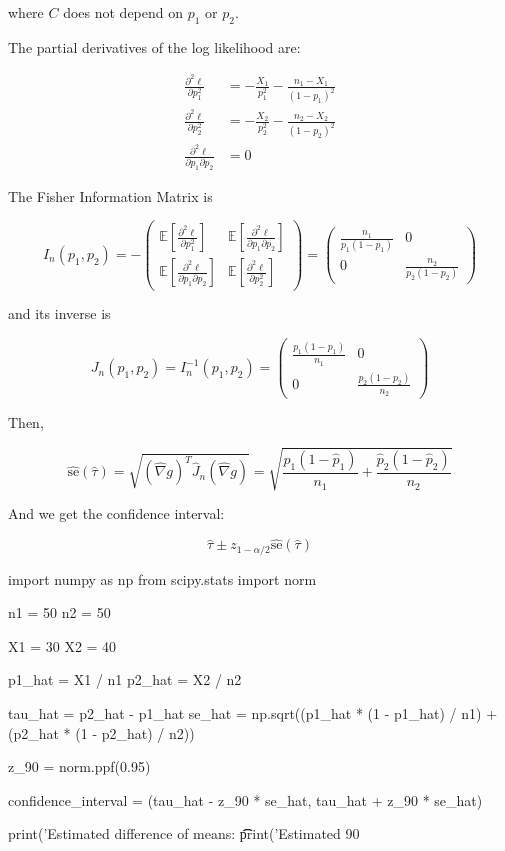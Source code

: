where \(C\) does not depend on \(p_1\) or \(p_2\).

The partial derivatives of the log likelihood are:

\begin{align}
\frac{\partial^2 \ell}{\partial p_1^2} & = - \frac{X_1}{p_1^2} - \frac{n_1 - X_1}{(1 - p_1)^2} \\
\frac{\partial^2 \ell}{\partial p_2^2} & = - \frac{X_2}{p_2^2} - \frac{n_2 - X_2}{(1 - p_2)^2} \\
\frac{\partial^2 \ell}{\partial p_1 \partial p_2} & = 0
\end{align}

The Fisher Information Matrix is

\[ I_n(p_1, p_2) = -\begin{pmatrix}
\mathbb{E}\left[ \frac{\partial^2 \ell}{\partial p_1^2} \right]
& \mathbb{E}\left[ \frac{\partial^2 \ell}{\partial p_1 \partial p_2} \right]  \\
\mathbb{E}\left[ \frac{\partial^2 \ell}{\partial p_1 \partial p_2} \right]
& \mathbb{E}\left[ \frac{\partial^2 \ell}{\partial p_2^2} \right]
\end{pmatrix} = \begin{pmatrix}
\frac{n_1}{p_1(1 - p_1)} & 0 \\
0 & \frac{n_2}{p_2(1 - p_2)}
\end{pmatrix}\]

and its inverse is

\[J_n(p_1, p_2) = I_n^{-1}(p_1, p_2) = \begin{pmatrix} 
\frac{p_1(1 - p_1)}{n_1} & 0 \\
0 & \frac{p_2(1 - p_2)}{n_2}
\end{pmatrix}\]

Then,

\[\hat{\text{se}}(\hat{\tau}) = \sqrt{(\hat{\nabla}g)^T \hat{J}_n (\hat{\nabla}g)}
= \sqrt{\frac{\hat{p}_1(1 - \hat{p}_1)}{n_1} + \frac{\hat{p}_2(1 - \hat{p}_2)}{n_2}}
\]

And we get the confidence interval:

\[ \hat{\tau} \pm z_{1 - \alpha/2}\hat{\text{se}}(\hat{\tau})\]

\begin{python}
import numpy as np
from scipy.stats import norm

n1 = 50
n2 = 50

X1 = 30
X2 = 40

p1_hat = X1 / n1
p2_hat = X2 / n2

tau_hat = p2_hat - p1_hat
se_hat = np.sqrt((p1_hat * (1 - p1_hat) / n1) + (p2_hat * (1 - p2_hat) / n2))

z_90 = norm.ppf(0.95)

confidence_interval = (tau_hat - z_90 * se_hat, tau_hat + z_90 * se_hat)

print('Estimated difference of means: \t\t %
print('Estimated 90%
\end{python}

